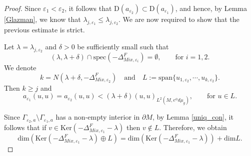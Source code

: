 \documentclass[12pt,a4paper]{amsart}
\numberwithin{equation}{section}
\theoremstyle{plain}
\theoremstyle{definition}
\begin{document}
\begin{proof}
	Since $\varepsilon_1 < \varepsilon_2$, it follows that $\mathrm{D}(a_{\varepsilon_2}) \subset \mathrm{D}(a_{\varepsilon_1})$, and hence, by Lemma \ref{Glazman}, we know that $\lambda_{j,\varepsilon_1} \leq \lambda_{j,\varepsilon_2}$. We are now required to show that the previous estimate is strict. 
	
	Let $\lambda = \lambda_{j,\varepsilon_2}$ and $\delta>0$ be sufficiently small such that
	\begin{equation*}
		(\lambda, \lambda+\delta) \cap \mathrm{spec}(-\Delta_{Mix,\varepsilon_i}^F) = \emptyset, \qquad \text{for } i=1,2.
	\end{equation*}
	We denote
	\begin{equation*}
		k = N\left(\lambda+\delta, -\Delta_{Mix,\varepsilon_2}^F\right) \quad \text{and} \quad L:= \textrm{span}\{u_{1,\varepsilon_2}, \cdots, u_{k,\varepsilon_2}\}.
	\end{equation*}
	Then $k\geq j$ and 
	\begin{equation}\label{ineq_eps_1}
		a_{\varepsilon_1}(u,u) = a_{\varepsilon_2}(u,u) < (\lambda +\delta) (u,u)_{L^2(M,e^\phi d\mu_g)}, \qquad \text{for } u\in L. 
	\end{equation}
	
	Since $\Gamma_{\varepsilon_2,a}\setminus\Gamma_{\varepsilon_1,a}$ has a non-empty interior in $\partial M$, by Lemma \ref{uniq_con}, it follows that if $v\in \mathrm{Ker}(-\Delta_{Mix,\varepsilon_1}^F - \lambda)$ then $v \notin L$. Therefore, we obtain
	\begin{equation}\label{dim_direct_sum}
		\mathrm{dim} \left(\mathrm{Ker}(-\Delta_{Mix,\varepsilon_1}^F - \lambda) \oplus L \right) = \mathrm{dim} \left(\mathrm{Ker}\left(-\Delta_{Mix,\varepsilon_1}^F - \lambda\right)\right) + \mathrm{dim} L.
	\end{equation}
	

\end{proof}
\end{document}
